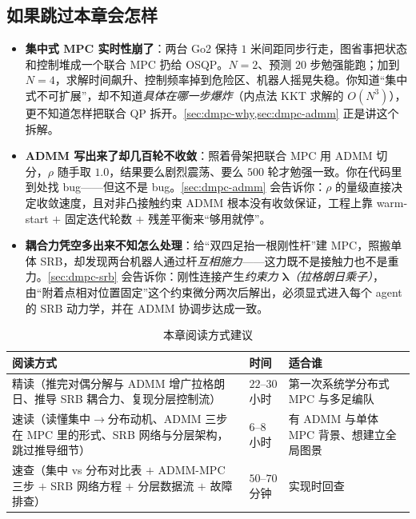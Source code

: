 \subsection*{如果跳过本章会怎样}
\begin{itemize}
  \item \textbf{集中式 MPC 实时性崩了}：两台 Go2 保持 $1$ 米间距同步行走，图省事把状态和控制堆成一个联合 MPC 扔给 OSQP。$N=2$、预测 $20$ 步勉强能跑；加到 $N=4$，求解时间飙升、控制频率掉到危险区、机器人摇晃失稳。你知道“集中式不可扩展”，却不知道\emph{具体在哪一步爆炸}（内点法 KKT 求解的 $O(N^3)$），更不知道怎样把联合 QP 拆开。\cref{sec:dmpc-why,sec:dmpc-admm} 正是讲这个拆解。
  \item \textbf{ADMM 写出来了却几百轮不收敛}：照着骨架把联合 MPC 用 ADMM 切分，$\rho$ 随手取 $1.0$，结果要么剧烈震荡、要么 $500$ 轮才勉强一致。你在代码里到处找 bug——但这不是 bug。\cref{sec:dmpc-admm} 会告诉你：$\rho$ 的量级直接决定收敛速度，且对非凸接触约束 ADMM 根本没有收敛保证，工程上靠 warm-start $+$ 固定迭代轮数 $+$ 残差平衡来“够用就停”。
  \item \textbf{耦合力凭空多出来不知怎么处理}：给“双四足抬一根刚性杆”建 MPC，照搬单体 SRB，却发现两台机器人通过杆\emph{互相施力}——这力既不是接触力也不是重力。\cref{sec:dmpc-srb} 会告诉你：刚性连接产生\emph{约束力 $\boldsymbol{\lambda}$（拉格朗日乘子）}，由“附着点相对位置固定”这个约束微分两次后解出，必须显式进入每个 agent 的 SRB 动力学，并在 ADMM 协调步达成一致。
\end{itemize}

\begin{table}[H]\centering\small
\caption{本章阅读方式建议}
\label{tab:dmpc-reading}
\begin{tabular}{lll}
\toprule
阅读方式 & 时间 & 适合谁 \\
\midrule
精读（推完对偶分解与 ADMM 增广拉格朗日、推导 SRB 耦合力、复现分层控制流） & $22$--$30$ 小时 & 第一次系统学分布式 MPC 与多足编队 \\
速读（读懂集中$\to$分布动机、ADMM 三步在 MPC 里的形式、SRB 网络与分层架构，跳过推导细节） & $6$--$8$ 小时 & 有 ADMM 与单体 MPC 背景、想建立全局图景 \\
速查（集中 vs 分布对比表 $+$ ADMM-MPC 三步 $+$ SRB 网络方程 $+$ 分层数据流 $+$ 故障排查） & $50$--$70$ 分钟 & 实现时回查 \\
\bottomrule
\end{tabular}
\end{table}

